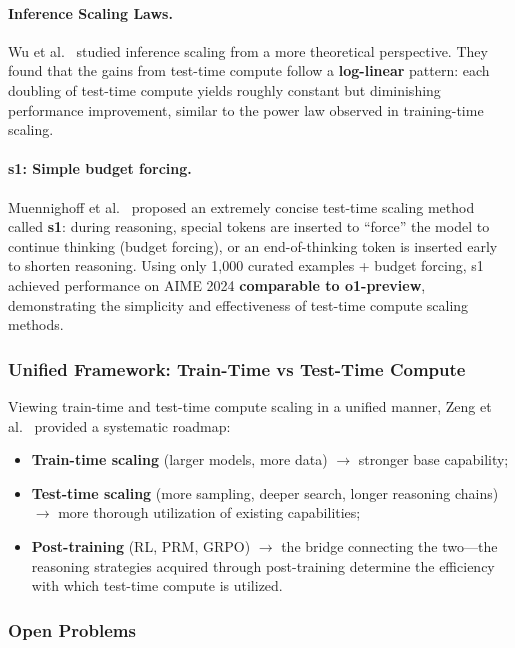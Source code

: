 \paragraph{Inference Scaling Laws.}
Wu et al.\ \cite{wu2024inferencescaling} studied inference scaling from a more theoretical perspective.
They found that the gains from test-time compute follow a \textbf{log-linear} pattern:
each doubling of test-time compute yields roughly constant but diminishing performance improvement,
similar to the power law observed in training-time scaling.

\paragraph{s1: Simple budget forcing.}
Muennighoff et al.\ \cite{muennighoff2025s1} proposed
an extremely concise test-time scaling method called \textbf{s1}:
during reasoning, special tokens are inserted to ``force'' the model to continue thinking (budget forcing),
or an end-of-thinking token is inserted early to shorten reasoning.
Using only 1,000 curated examples + budget forcing,
s1 achieved performance on AIME 2024 \textbf{comparable to o1-preview},
demonstrating the simplicity and effectiveness of test-time compute scaling methods.

\subsubsection{Unified Framework: Train-Time vs Test-Time Compute}

Viewing train-time and test-time compute scaling in a unified manner,
Zeng et al.\ \cite{zeng2024roadmapo1} provided a systematic roadmap:
\begin{itemize}[leftmargin=2em]
  \item \textbf{Train-time scaling} (larger models, more data)
    $\rightarrow$ stronger base capability;
  \item \textbf{Test-time scaling} (more sampling, deeper search, longer reasoning chains)
    $\rightarrow$ more thorough utilization of existing capabilities;
  \item \textbf{Post-training} (RL, PRM, GRPO)
    $\rightarrow$ the bridge connecting the two---the reasoning strategies acquired through post-training
    determine the efficiency with which test-time compute is utilized.
\end{itemize}

\subsubsection{Open Problems}

